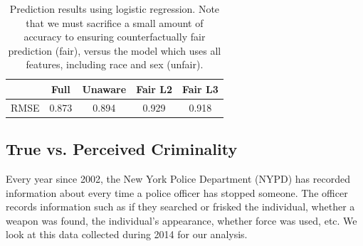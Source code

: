 
\begin{table}
\centering
\caption{Prediction results using logistic regression. Note that we must sacrifice a small amount of accuracy to ensuring counterfactually fair prediction (fair), versus the model which uses all features, including race and sex (unfair).}\label{table.pred_law}
\begin{tabular}{ccccc} 
\hline
 &  {\bf Full} & {\bf Unaware} & {\bf Fair L2} & {\bf Fair L3} \\
\hline
RMSE & 0.873 & 0.894 & 0.929 & 0.918 \\
\hline
\end{tabular}
\end{table}



\subsection{True vs. Perceived Criminality}
\label{sec:true-vs.-perceived}
Every year since 2002, the New York Police Department (NYPD) has recorded information about every time a police officer has stopped someone. The officer records information such as if they searched or frisked the individual, whether a weapon was found, the individual's appearance, whether force was used, etc. We look at this data collected during 2014 for our analysis.

